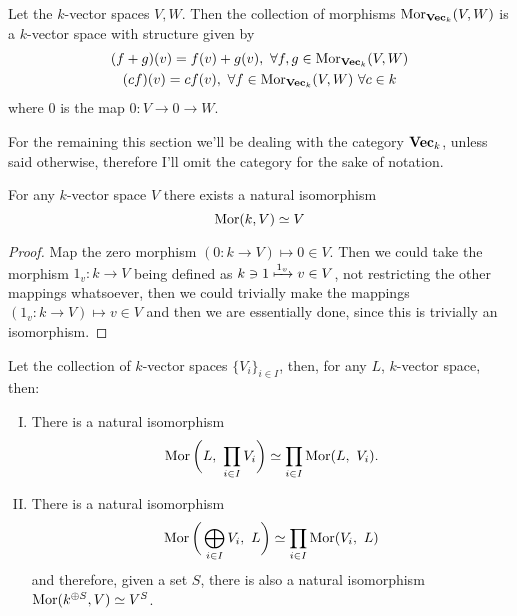\begin{definition}
  Let the \(k\)-vector spaces \(V, W\). Then the collection of morphisms
  \(\operatorname{Mor}_{{\textbf{Vec}}_k}(V, W)\) is a \(k\)-vector space with structure given by
  \begin{gather*}
    (f + g)(v) = f(v) + g(v),\ \forall f, g \in \operatorname{Mor}_{{\textbf{Vec}}_k}(V, W) \\
    (cf)(v) = c f(v),\ \forall f \in \operatorname{Mor}_{{\textbf{Vec}}_k}(V, W)\ \forall c \in k
  \end{gather*}
  where \(0\) is the map \(0 : V \to 0 \to W\).
\end{definition}

\begin{remark}
  For the remaining this section we'll be dealing with the category
  \({\textbf{Vec}}_k\), unless said otherwise, therefore I'll omit the
  category for the sake of notation.
\end{remark}

\begin{proposition}
   For any \(k\)-vector space \(V\) there exists a natural isomorphism
   \[
     \operatorname{Mor}(k, V) \simeq V
   \]
\end{proposition}

\begin{proof}
  Map the zero morphism \((0 : k \to V) \longmapsto 0 \in V\). Then we could take
  the morphism \(1_v : k \to V\) being defined as \(k \ni 1 \xmapsto{1_v} v \in
  V\), not restricting the other mappings whatsoever, then we could trivially
  make the mappings \((1_v : k \to V) \longmapsto v \in V\) and then we are
  essentially done, since this is trivially an isomorphism.
\end{proof}

\begin{proposition}
  Let the collection of \(k\)-vector spaces \(\{V_i\}_{i \in I}\), then, for any
  \(L\), \(k\)-vector space, then:
  \begin{enumerate}[I.]
    \item There is a natural isomorphism
      \[
        \operatorname{Mor} \bigg( L,\ \prod_{i \in I} V_i \bigg) \simeq \prod_{i \in
        I} \operatorname{Mor}(L,\ V_i).
      \]
    \item There is a natural isomorphism
      \[
        \operatorname{Mor}\bigg( \bigoplus_{i \in I} V_i,\ L \bigg) \simeq
        \prod_{i \in I} \operatorname{Mor}(V_i,\ L)
      \]
      and therefore, given a set \(S\), there is also a natural isomorphism
      \(\operatorname{Mor}(k^{\oplus S}, V) \simeq V^S\).
  \end{enumerate}
\end{proposition}

